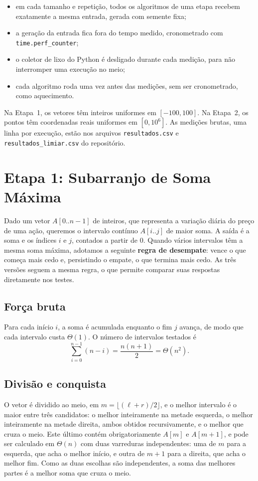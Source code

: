 \documentclass[11pt,a4paper]{article}
\begin{document}
\begin{itemize}
  \item em cada tamanho e repetição, todos os algoritmos de uma etapa recebem exatamente a mesma entrada, gerada com semente fixa;
  \item a geração da entrada fica fora do tempo medido, cronometrado com \texttt{time.perf\_counter};
  \item o coletor de lixo do Python é desligado durante cada medição, para não interromper uma execução no meio;
  \item cada algoritmo roda uma vez antes das medições, sem ser cronometrado, como aquecimento.
\end{itemize}

Na Etapa~1, os vetores têm inteiros uniformes em $[-100, 100]$. Na Etapa~2, os pontos têm coordenadas reais uniformes em $[0, 10^6]$. As medições brutas, uma linha por execução, estão nos arquivos \texttt{resultados.csv} e \texttt{resultados\_limiar.csv} do repositório.

\section{Etapa 1: Subarranjo de Soma Máxima}

Dado um vetor $A[0..n-1]$ de inteiros, que representa a variação diária do preço de uma ação, queremos o intervalo contínuo $A[i..j]$ de maior soma. A saída é a soma e os índices $i$ e $j$, contados a partir de 0. Quando vários intervalos têm a mesma soma máxima, adotamos a seguinte \textbf{regra de desempate}: vence o que começa mais cedo e, persistindo o empate, o que termina mais cedo. As três versões seguem a mesma regra, o que permite comparar suas respostas diretamente nos testes.

\subsection{Força bruta}

Para cada início $i$, a soma é acumulada enquanto o fim $j$ avança, de modo que cada intervalo custa $\Theta(1)$. O número de intervalos testados é
\[
\sum_{i=0}^{n-1} (n - i) = \frac{n(n+1)}{2} = \Theta(n^2).
\]

\subsection{Divisão e conquista}

O vetor é dividido ao meio, em $m = \lfloor (\ell + r)/2 \rfloor$, e o melhor intervalo é o maior entre três candidatos: o melhor inteiramente na metade esquerda, o melhor inteiramente na metade direita, ambos obtidos recursivamente, e o melhor que cruza o meio. Este último contém obrigatoriamente $A[m]$ e $A[m+1]$, e pode ser calculado em $\Theta(n)$ com duas varreduras independentes: uma de $m$ para a esquerda, que acha o melhor início, e outra de $m+1$ para a direita, que acha o melhor fim. Como as duas escolhas são independentes, a soma das melhores partes é a melhor soma que cruza o meio.
\end{document}
